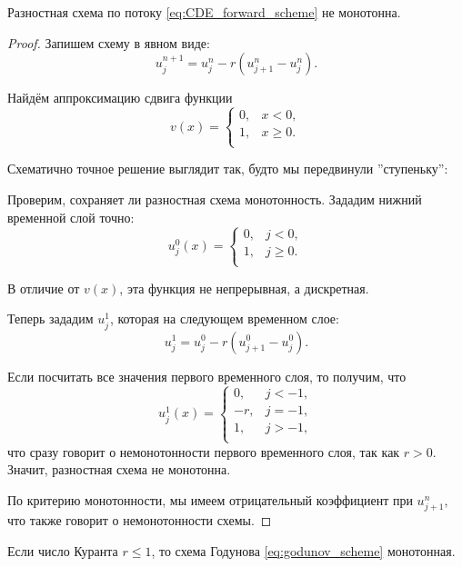 \documentclass{article}
\begin{document}
\begin{lemma}
	Разностная схема по потоку \eqref{eq:CDE_forward_scheme} не монотонна.
\end{lemma}

\begin{proof}\label{eq:CDE_forward_scheme_lemma}
	Запишем схему в явном виде:
	\[u_j^{n+1}=u_j^n-r(u_{j+1}^n-u_j^n).\]

	Найдём аппроксимацию сдвига функции
	\[v(x)=
		\begin{cases}
			0, & x<0, \\
			1, & x\ge 0. \\
		\end{cases}
	\]

	Схематично точное решение выглядит так, будто мы передвинули
	''ступеньку'':

	

	Проверим, сохраняет ли разностная схема монотонность. Зададим нижний
	временной слой точно:
	\[u_j^0(x)=
		\begin{cases}
			0, & j<0, \\
			1, & j\ge 0. \\
		\end{cases}
	\]

	В отличие от $v(x)$, эта функция не непрерывная, а дискретная.

	Теперь зададим $u_j^1$, которая на следующем временном слое:
	\[u_j^1=u_j^0-r(u_{j+1}^0-u_j^0).\]

	Если посчитать все значения первого временного слоя, то получим, что
	\[u_j^1(x)=
		\begin{cases}
			0, & j<-1, \\
			-r,& j=-1, \\
			1, & j>-1, \\
		\end{cases}
	\]
	что сразу говорит о немонотонности первого временного слоя, так как
	$r>0$. Значит, разностная схема не монотонна.

	По критерию монотонности, мы имеем отрицательный коэффициент при
	$u_{j+1}^n$, что также говорит о немонотонности схемы.
\end{proof}

\begin{theorem}\label{eq:courant_condition}
	Если число Куранта $r\le 1$, то схема Годунова
	\eqref{eq:godunov_scheme} монотонная.
\end{theorem}
\end{document}

